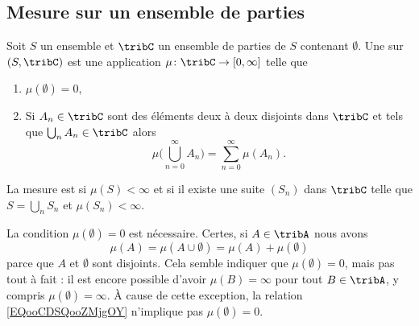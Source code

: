 \subsection{Mesure sur un ensemble de parties}

\begin{definition}       \label{DefWUPHooEklLmR}
    Soit \( S\) un ensemble et \( \tribC\) un ensemble de parties de \( S\) contenant \( \emptyset\). Une  sur \( (S,\tribC)\) est une application \( \mu\colon \tribC\to \mathopen[ 0 , \infty \mathclose]\) telle que
    \begin{enumerate}
        \item
            \( \mu(\emptyset)=0\),
        \item
            Si \( A_n\in\tribC\) sont des éléments deux à deux disjoints dans \( \tribC\) et tels que \( \bigcup_nA_n\in\tribC\) alors
            \begin{equation}
                \mu\big( \bigcup_{n=0}^{\infty}A_n \big)=\sum_{n=0}^{\infty}\mu(A_n).
            \end{equation}
    \end{enumerate}

    La mesure est  si \( \mu(S)<\infty\) et  si il existe une suite \( (S_n)\) dans \( \tribC\) telle que \( S=\bigcup_nS_n\) et \( \mu(S_n)<\infty\).
\end{definition}

\begin{remark}
    La condition \( \mu(\emptyset)=0\) est nécessaire. Certes, si \( A\in \tribA\) nous avons
    \begin{equation}        \label{EQooCDSQooZMjgOY}
        \mu(A)=\mu(A\cup \emptyset)=\mu(A)+\mu(\emptyset)
    \end{equation}
    parce que \( A\) et \( \emptyset\) sont disjoints. Cela semble indiquer que \( \mu(\emptyset)=0\), mais pas tout à fait : il est encore possible d'avoir \( \mu(B)=\infty\) pour tout \( B\in\tribA\), y compris \( \mu(\emptyset)=\infty\). À cause de cette exception, la relation \eqref{EQooCDSQooZMjgOY} n'implique pas \( \mu(\emptyset)=0\).
\end{remark}

